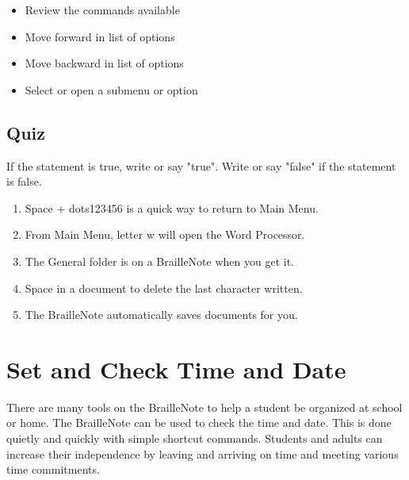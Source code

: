 \documentclass[10pt,letterpaper,twoside]{report}
\begin{document}
\begin{enumerate}
	      \begin{itemize}
		      \item Review the commands available 
		      \item Move forward in list of options 
		      \item Move backward in list of options 
		      \item Select or open a submenu or option 
	      \end{itemize}
\end{enumerate}
\subsection{Quiz}
If the statement is true, write or say "true". Write or say "false" if the statement is false.
\begin{enumerate}
	\item Space + dots123456 is a quick way to return to Main Menu.
	\item From Main Menu, letter w will open the Word Processor.
	\item The General folder is on a BrailleNote when you get it.
	\item Space in a document to delete the last character written.
	\item The BrailleNote automatically saves documents for you.
\end{enumerate}



\clearpage
\section{Set and Check Time and Date}
There are many tools on the BrailleNote to help a student be organized at school or home. The BrailleNote can be used to check the time and date. This is done quietly and quickly with simple shortcut commands. Students and adults can increase their independence by leaving and arriving on time and meeting various time commitments.
\end{document}
